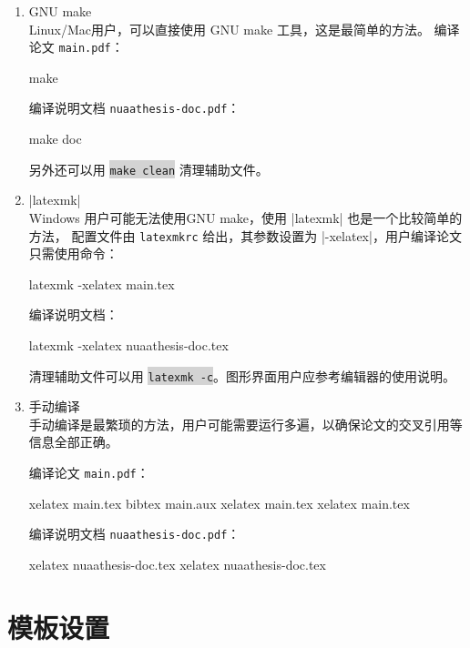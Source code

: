 \documentclass[a4paper]{ltxdoc}
\DeclareRobustCommand\file{\nolinkurl}
\newcommand\shellcmd[1]{\colorbox{lightgray}{\lstinline[style=lstshell]|#1|}}
\begin{document}
\begin{enumerate}

    \item GNU make \\
          Linux/Mac用户，可以直接使用 GNU make 工具，这是最简单的方法。
          编译论文 \file{main.pdf}：
          \begin{shell}
              make
          \end{shell}
          编译说明文档 \file{nuaathesis-doc.pdf}：
          \begin{shell}
              make doc
          \end{shell}
          另外还可以用 \shellcmd{make clean} 清理辅助文件。

    \item |latexmk| \\
          Windows 用户可能无法使用GNU make，使用 |latexmk| 也是一个比较简单的方法，
          配置文件由 \file{latexmkrc} 给出，其参数设置为 |-xelatex|，用户编译论文
          只需使用命令：
          \begin{shell}
              latexmk -xelatex main.tex
          \end{shell}
          编译说明文档：
          \begin{shell}
              latexmk -xelatex nuaathesis-doc.tex
          \end{shell}
          清理辅助文件可以用 \shellcmd{latexmk -c}。图形界面用户应参考编辑器的使用说明。

    \item 手动编译 \\
          手动编译是最繁琐的方法，用户可能需要运行多遍，以确保论文的交叉引用等信息全部正确。

          编译论文 \file{main.pdf}：
          \begin{shell}
              xelatex main.tex
              bibtex main.aux
              xelatex main.tex
              xelatex main.tex
          \end{shell}
          编译说明文档 \file{nuaathesis-doc.pdf}：
          \begin{shell}
              xelatex nuaathesis-doc.tex
              xelatex nuaathesis-doc.tex
          \end{shell}
\end{enumerate}



\section{模板设置}
\end{document}
